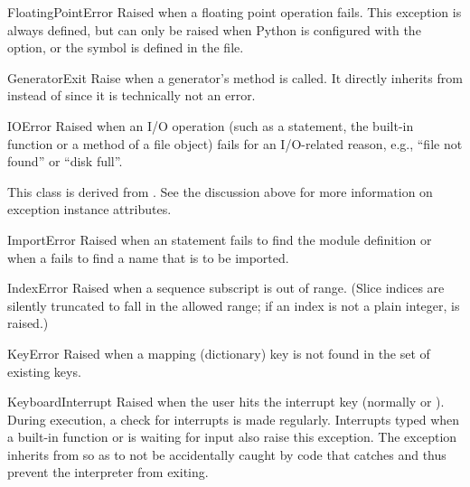 \begin{excdesc}{FloatingPointError}
  Raised when a floating point operation fails.  This exception is
  always defined, but can only be raised when Python is configured
  with the  option, or the
   symbol is defined in the
   file.
\end{excdesc}

\begin{excdesc}{GeneratorExit}
  Raise when a generator's  method is called.
  It directly inherits from  instead of
   since it is technically not an error.
\end{excdesc}

\begin{excdesc}{IOError}
  Raised when an I/O operation (such as a  statement,
  the built-in  function or a method of a file
  object) fails for an I/O-related reason, e.g., ``file not found'' or
  ``disk full''.

  This class is derived from .  See the
  discussion above for more information on exception instance
  attributes.
\end{excdesc}

\begin{excdesc}{ImportError}
  Raised when an  statement fails to find the module
  definition or when a  fails to find a
  name that is to be imported.
\end{excdesc}

\begin{excdesc}{IndexError}
  Raised when a sequence subscript is out of range.  (Slice indices are
  silently truncated to fall in the allowed range; if an index is not a
  plain integer,  is raised.)
\end{excdesc}

\begin{excdesc}{KeyError}
  Raised when a mapping (dictionary) key is not found in the set of
  existing keys.
\end{excdesc}

\begin{excdesc}{KeyboardInterrupt}
  Raised when the user hits the interrupt key (normally
   or ).  During execution, a check for
  interrupts is made regularly.
  Interrupts typed when a built-in function  or
   is waiting for input also raise this
  exception.
  The exception inherits from  so as to not be
  accidentally caught by code that catches  and thus
  prevent the interpreter from exiting.
\end{excdesc}

